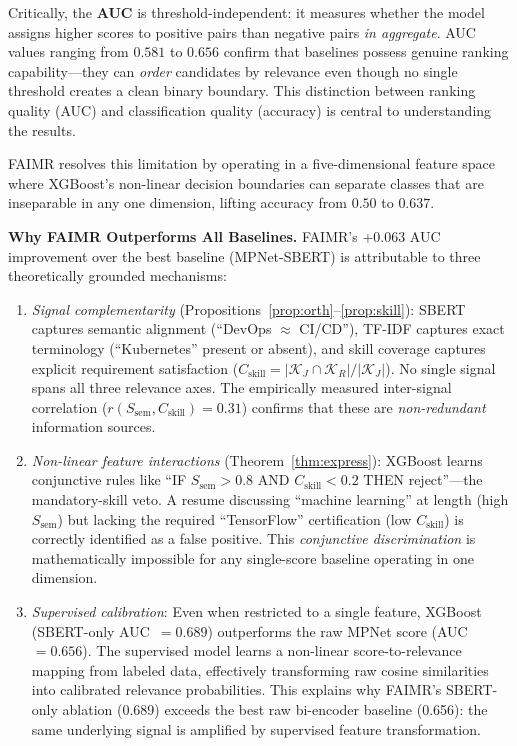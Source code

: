 \documentclass[smallcondensed,numbers]{sn-jnl}
\begin{document}
Critically, the \textbf{AUC} is threshold-independent: it measures whether the model assigns higher scores to positive pairs than negative pairs \textit{in aggregate}. AUC values ranging from $0.581$ to $0.656$ confirm that baselines possess genuine ranking capability---they can \textit{order} candidates by relevance even though no single threshold creates a clean binary boundary. This distinction between ranking quality (AUC) and classification quality (accuracy) is central to understanding the results.

FAIMR resolves this limitation by operating in a five-dimensional feature space where XGBoost's non-linear decision boundaries can separate classes that are inseparable in any one dimension, lifting accuracy from $0.50$ to $0.637$.

\textbf{Why FAIMR Outperforms All Baselines.} FAIMR's $+0.063$ AUC improvement over the best baseline (MPNet-SBERT) is attributable to three theoretically grounded mechanisms:

\begin{enumerate}
    \item \textit{Signal complementarity} (Propositions~\ref{prop:orth}--\ref{prop:skill}): SBERT captures semantic alignment (``DevOps $\approx$ CI/CD''), TF-IDF captures exact terminology (``Kubernetes'' present or absent), and skill coverage captures explicit requirement satisfaction ($C_\text{skill} = |\mathcal{K}_J \cap \mathcal{K}_R|/|\mathcal{K}_J|$). No single signal spans all three relevance axes. The empirically measured inter-signal correlation ($r(S_\text{sem}, C_\text{skill}) = 0.31$) confirms that these are \textit{non-redundant} information sources.

    \item \textit{Non-linear feature interactions} (Theorem~\ref{thm:express}): XGBoost learns conjunctive rules like ``IF $S_\text{sem} > 0.8$ AND $C_\text{skill} < 0.2$ THEN reject''---the mandatory-skill veto. A resume discussing ``machine learning'' at length (high $S_\text{sem}$) but lacking the required ``TensorFlow'' certification (low $C_\text{skill}$) is correctly identified as a false positive. This \textit{conjunctive discrimination} is mathematically impossible for any single-score baseline operating in one dimension.

    \item \textit{Supervised calibration}: Even when restricted to a single feature, XGBoost (SBERT-only AUC~$= 0.689$) outperforms the raw MPNet score (AUC~$= 0.656$). The supervised model learns a non-linear score-to-relevance mapping from labeled data, effectively transforming raw cosine similarities into calibrated relevance probabilities. This explains why FAIMR's SBERT-only ablation (0.689) exceeds the best raw bi-encoder baseline (0.656): the same underlying signal is amplified by supervised feature transformation.
\end{enumerate}
\end{document}
